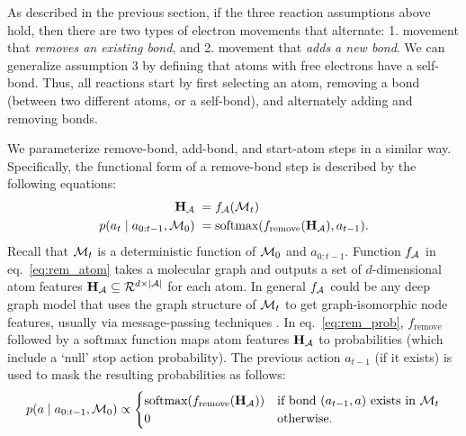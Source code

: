 As described in the previous section, if the three reaction assumptions above hold, then there are two types of electron movements that alternate: 1. movement that \emph{removes an existing bond}, and 2. movement that \emph{adds a new bond}. We can generalize assumption 3 by defining that atoms with free electrons have a self-bond. Thus, all reactions start by first selecting an atom, removing a bond (between two different atoms, or a self-bond), and alternately adding and removing bonds. %

We parameterize remove-bond, add-bond, and start-atom steps in a similar way. Specifically, the functional form of a remove-bond step is described by the following equations:
\begin{align}
\Hb_{\Ac} \;&= f_{\Ac}(\Mc_t) \label{eq:rem_atom} \\
p(a_t \mid a_{0:t-1}, \Mc_0) \;&= \mbox{softmax}(f_{\textrm{remove}}(\Hb_{\Ac}), a_{t-1}). \label{eq:rem_prob}  %
\end{align}
Recall that ${\mathcal{M}}_t$ is a deterministic function of ${\mathcal{M}}_0$ and $a_{0:t-1}$.
Function $f_{{\mathcal{A}}}$ in eq.~\eqref{eq:rem_atom} takes a molecular graph and outputs a set of $d$-dimensional atom features ${\mathbf{H}}_{{\mathcal{A}}} \subseteq \mathcal{R}^{d \times |{\mathcal{A}}|}$ for each atom. In general $f_{{\mathcal{A}}}$ could be any deep graph model that uses the graph structure of ${\mathcal{M}}_t$ to get graph-isomorphic node features, usually via message-passing techniques \citep{gilmer2017neural}.
In eq.~\eqref{eq:rem_prob}, $f_{\textrm{remove}}$ followed by a $\mbox{softmax}$ function maps atom features ${\mathbf{H}}_{{\mathcal{A}}}$ to probabilities (which include a `null' stop action probability). The previous action $a_{t-1}$ (if it exists) is used to mask the resulting probabilities as follows:
\begin{align}
p(a \mid a_{0:t-1}, {\mathcal{M}}_0) \propto 
\begin{cases}
\mbox{softmax}(f_{\textrm{remove}}({\mathbf{H}}_{{\mathcal{A}}})) & \mbox{if bond } (a_{t-1},a) \mbox{ exists in } {\mathcal{M}}_t \\
0 & \mbox{otherwise}. \nonumber
\end{cases}
\end{align}
